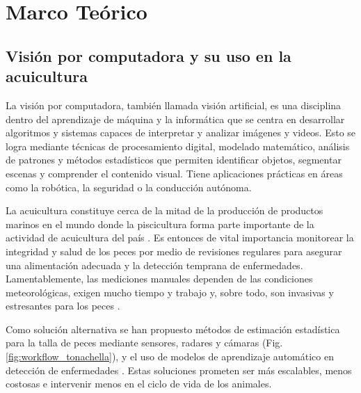\section{Marco Teórico}
\subsection{Visión por computadora y su uso en la acuicultura}
La visión por computadora, también llamada visión artificial, es una disciplina dentro del aprendizaje de máquina y la informática que se centra en desarrollar algoritmos y sistemas capaces de interpretar y analizar imágenes y videos. Esto se logra mediante técnicas de procesamiento digital, modelado matemático, análisis de patrones y métodos estadísticos que permiten identificar objetos, segmentar escenas y comprender el contenido visual. Tiene aplicaciones prácticas en áreas como la robótica, la seguridad o la conducción autónoma.

La acuicultura constituye cerca de la mitad de la producción de productos marinos en el mundo \cite{FAO2024} donde la piscicultura forma parte importante de la actividad de acuicultura del país \cite{chile2017levantamiento}. Es entonces de vital importancia monitorear la integridad y salud de los peces por medio de revisiones regulares para asegurar una alimentación adecuada y la detección temprana de enfermedades. Lamentablemente, las mediciones manuales dependen de las condiciones meteorológicas, exigen mucho tiempo y trabajo y, sobre todo, son invasivas y estresantes para los peces \cite{Tonachella2022}.

Como solución alternativa se han propuesto métodos de estimación estadística para la talla de peces mediante sensores, radares y cámaras \cite{Tonachella2022} (Fig. \ref{fig:workflow_tonachella}), y el uso de modelos de aprendizaje automático en detección de enfermedades \cite{Ahmed2022}. Estas soluciones prometen ser más escalables, menos costosas e intervenir menos en el ciclo de vida de los animales.

